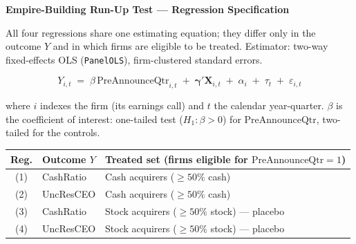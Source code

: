 \begin{center}
{\large\bfseries Empire-Building Run-Up Test --- Regression Specification}
\end{center}

\vspace{4pt}
\noindent All four regressions share one estimating equation; they differ only in the
outcome $Y$ and in which firms are eligible to be treated. Estimator: two-way
fixed-effects OLS (\texttt{PanelOLS}), firm-clustered standard errors.

\begin{equation*}
Y_{i,t} \;=\; \beta\,\mathrm{PreAnnounceQtr}_{i,t}
\;+\; \boldsymbol{\gamma}'\mathbf{X}_{i,t}
\;+\; \alpha_i \;+\; \tau_t \;+\; \varepsilon_{i,t}
\end{equation*}

\noindent where $i$ indexes the firm (its earnings call) and $t$ the calendar
year-quarter. $\beta$ is the coefficient of interest: one-tailed test ($H_1:\beta>0$)
for $\mathrm{PreAnnounceQtr}$, two-tailed for the controls.

\begin{center}
\small
\begin{tabular}{cll}
\toprule
Reg. & Outcome $Y$ & Treated set (firms eligible for $\mathrm{PreAnnounceQtr}=1$) \\
\midrule
(1) & CashRatio  & Cash acquirers ($\geq 50\%$ cash) \\
(2) & UncResCEO  & Cash acquirers ($\geq 50\%$ cash) \\
(3) & CashRatio  & Stock acquirers ($\geq 50\%$ stock) --- placebo \\
(4) & UncResCEO  & Stock acquirers ($\geq 50\%$ stock) --- placebo \\
\bottomrule
\end{tabular}
\end{center}

